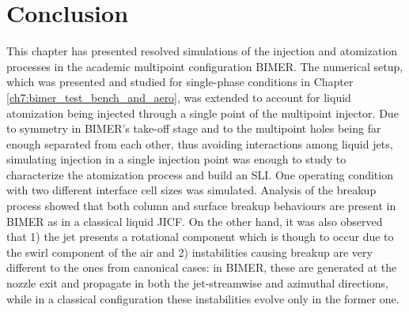 \section{Conclusion}

This chapter has presented resolved simulations of the injection and atomization processes in the academic multipoint configuration BIMER. The numerical setup, which was presented and studied for single-phase conditions in Chapter \ref{ch7:bimer_test_bench_and_aero}, was extended to account for liquid atomization being injected through a single point of the multipoint injector. Due to symmetry in BIMER's take-off stage and to the multipoint holes being far enough separated from each other, thus avoiding interactions among liquid jets, simulating injection in a single injection point was enough to study to characterize the atomization process and build an SLI. One operating condition with two different interface cell sizes was simulated. Analysis of the breakup process showed that both column and surface breakup behaviours are present in BIMER as in a classical liquid JICF. On the other hand, it was also observed that 1) the jet presents a rotational component which is though to occur due to the swirl component of the air and 2) instabilities causing breakup are very different to the ones from canonical cases: in BIMER, these are generated at the nozzle exit and propagate in both the jet-streamwise and azimuthal directions, while in a classical configuration these instabilities evolve only in the former one. 

